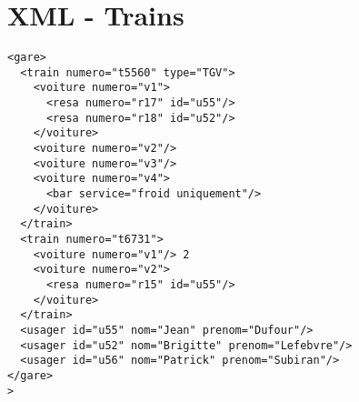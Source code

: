 \chapter{XML - Trains}
\begin{verbatim}
<gare>
  <train numero="t5560" type="TGV">
    <voiture numero="v1">
      <resa numero="r17" id="u55"/>
      <resa numero="r18" id="u52"/>
    </voiture>
    <voiture numero="v2"/>
    <voiture numero="v3"/>
    <voiture numero="v4">
      <bar service="froid uniquement"/>
    </voiture>
  </train>
  <train numero="t6731">
    <voiture numero="v1"/> 2
    <voiture numero="v2">
      <resa numero="r15" id="u55"/>
    </voiture>
  </train>
  <usager id="u55" nom="Jean" prenom="Dufour"/>
  <usager id="u52" nom="Brigitte" prenom="Lefebvre"/>
  <usager id="u56" nom="Patrick" prenom="Subiran"/>
</gare>
>\end{verbatim}